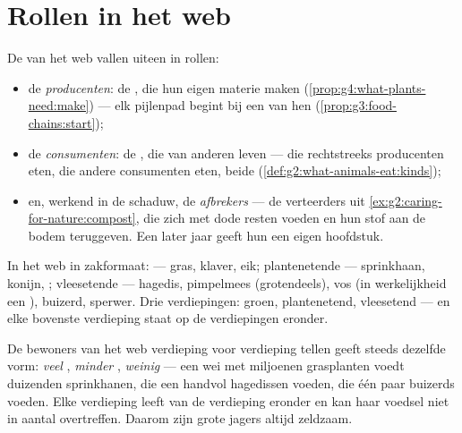 \section{Rollen in het web}

\begin{definition}\label{def:g5:food-webs:roles}
De  van het web vallen uiteen in rollen:
\begin{itemize}
  \item de \emph{producenten}: de , die hun
        eigen materie maken
        (\cref{prop:g4:what-plants-need:make}) --- elk pijlenpad begint
        bij een van hen
        (\cref{prop:g3:food-chains:start});
  \item de \emph{consumenten}: de , die van
        anderen leven ---  die rechtstreeks producenten
        eten,  die andere consumenten eten,  beide
        (\cref{def:g2:what-animals-eat:kinds});
  \item en, werkend in de schaduw, de
        \emph{afbrekers} --- de verteerders uit
        \cref{ex:g2:caring-for-nature:compost}, die zich met dode
        resten voeden en hun stof aan de bodem teruggeven. Een later
        jaar geeft hun een eigen hoofdstuk.
\end{itemize}
\end{definition}

\begin{example}\label{ex:g5:food-webs:sorting}
In het web in zakformaat:  --- gras, klaver, eik;
plantenetende  --- sprinkhaan, konijn, ; vleesetende
 --- hagedis, pimpelmees (grotendeels), vos (in werkelijkheid
een ), buizerd, sperwer. Drie verdiepingen: groen,
plantenetend, vleesetend --- en elke bovenste verdieping staat op de
verdiepingen eronder.
\end{example}

\begin{proposition}\label{prop:g5:food-webs:pyramid}
De bewoners van het web verdieping voor verdieping tellen geeft steeds
dezelfde vorm: \emph{veel} , \emph{minder} ,
\emph{weinig}  --- een wei met miljoenen grasplanten voedt
duizenden sprinkhanen, die een handvol hagedissen voeden, die één paar
buizerds voeden. Elke verdieping leeft van de verdieping eronder en kan
haar voedsel niet in aantal overtreffen. Daarom zijn grote jagers altijd
zeldzaam.
\end{proposition}
\admitted

